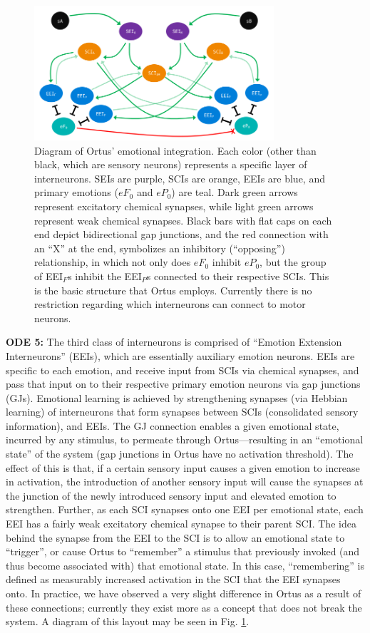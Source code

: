 \documentclass[letterpaper]{article}
\begin{document}
\begin{figure}[t]
\begin{center}
\includegraphics[width=3.5in]{images/ortus_diagram.png}
\caption{Diagram of Ortus' emotional integration. Each color (other than black, which are sensory neurons) represents a specific layer of interneurons. SEIs are purple, SCIs are orange, EEIs are blue, and primary emotions ($eF_0$ and $eP_0$) are teal. Dark green arrows represent excitatory chemical synapses, while light green arrows represent weak chemical synapses. Black bars with flat caps on each end depict bidirectional gap junctions, and the red connection with an ``X'' at the end, symbolizes an inhibitory (``opposing'') relationship, in which not only does $eF_0$ inhibit $eP_0$, but the group of EEI$_F$s inhibit the EEI$_P$s connected to their respective SCIs. This is the basic structure that Ortus employs. Currently there is no restriction regarding which interneurons can connect to motor neurons.}
\label{diagram}
\end{center}
\end{figure}

\textbf{ODE 5:} The third class of interneurons is comprised of ``Emotion Extension Interneurons'' (EEIs), which are essentially auxiliary emotion neurons.
EEIs are specific to each emotion, and receive input from SCIs via chemical synapses, and pass that input on to their respective primary emotion neurons via gap junctions (GJs).
Emotional learning is achieved by strengthening synapses (via Hebbian learning) of interneurons that form synapses between SCIs (consolidated sensory information), and EEIs.
The GJ connection enables a given emotional state, incurred by any stimulus, to permeate through Ortus---resulting in an ``emotional state'' of the system (gap junctions in Ortus have no activation threshold).
The effect of this is that, if a certain sensory input causes a given emotion to increase in activation, the introduction of another sensory input will cause the synapses at the junction of the newly introduced sensory input and elevated emotion to strengthen. 
Further, as each SCI synapses onto one EEI per emotional state, each EEI has a fairly weak excitatory chemical synapse to their parent SCI.
The idea behind the synapse from the EEI to the SCI is to allow an emotional state to ``trigger'', or cause Ortus to ``remember'' a stimulus that previously invoked (and thus become associated with) that emotional state.
In this case, ``remembering'' is defined as measurably increased activation in the SCI that the EEI synapses onto.
In practice, we have observed a very slight difference in Ortus as a result of these connections; currently they exist more as a concept that does not break the system. A diagram of this layout may be seen in Fig. \ref{diagram}.
\end{document}
